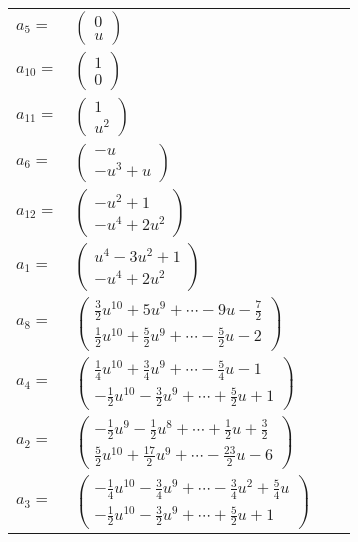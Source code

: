 \documentclass[1p]{elsarticle_modified}
\theoremstyle{definition}
\begin{document}
\begin{tabular}{m{7pt} m{180pt} m{7pt} m{180pt} }
\flushright $a_{5}=$&$\begin{pmatrix}0\\u\end{pmatrix}$ \\
\flushright $a_{10}=$&$\begin{pmatrix}1\\0\end{pmatrix}$ \\
\flushright $a_{11}=$&$\begin{pmatrix}1\\u^2\end{pmatrix}$ \\
\flushright $a_{6}=$&$\begin{pmatrix}- u\\- u^3+u\end{pmatrix}$ \\
\flushright $a_{12}=$&$\begin{pmatrix}- u^2+1\\- u^4+2 u^2\end{pmatrix}$ \\
\flushright $a_{1}=$&$\begin{pmatrix}u^4-3 u^2+1\\- u^4+2 u^2\end{pmatrix}$ \\
\flushright $a_{8}=$&$\begin{pmatrix}\frac{3}{2} u^{10}+5 u^9+\cdots-9 u-\frac{7}{2}\\\frac{1}{2} u^{10}+\frac{5}{2} u^9+\cdots-\frac{5}{2} u-2\end{pmatrix}$ \\
\flushright $a_{4}=$&$\begin{pmatrix}\frac{1}{4} u^{10}+\frac{3}{4} u^9+\cdots-\frac{5}{4} u-1\\-\frac{1}{2} u^{10}-\frac{3}{2} u^9+\cdots+\frac{5}{2} u+1\end{pmatrix}$ \\
\flushright $a_{2}=$&$\begin{pmatrix}-\frac{1}{2} u^9-\frac{1}{2} u^8+\cdots+\frac{1}{2} u+\frac{3}{2}\\\frac{5}{2} u^{10}+\frac{17}{2} u^9+\cdots-\frac{23}{2} u-6\end{pmatrix}$ \\
\flushright $a_{3}=$&$\begin{pmatrix}-\frac{1}{4} u^{10}-\frac{3}{4} u^9+\cdots-\frac{3}{4} u^2+\frac{5}{4} u\\-\frac{1}{2} u^{10}-\frac{3}{2} u^9+\cdots+\frac{5}{2} u+1\end{pmatrix}$ \\

\end{tabular}
\end{document}
